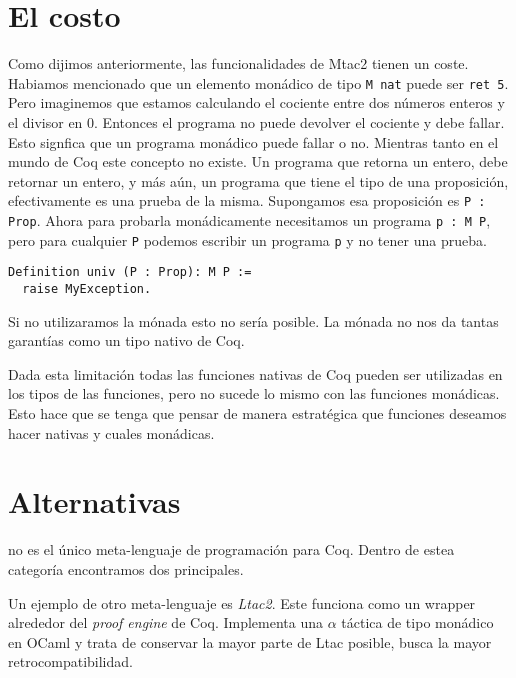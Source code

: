 \section{El costo}

Como dijimos anteriormente, las funcionalidades de Mtac2 tienen un coste. Habiamos mencionado que un elemento monádico de tipo \lstinline{M nat} puede ser \lstinline{ret 5}. Pero imaginemos que estamos calculando el cociente entre dos números enteros y el divisor en 0. Entonces el programa no puede devolver el cociente y debe fallar. Esto signfica que un programa monádico puede fallar o no. Mientras tanto en el mundo de Coq este concepto no existe. Un programa que retorna un entero, debe retornar un entero, y más aún, un programa que tiene el tipo de una proposición, efectivamente es una prueba de la misma. Supongamos esa proposición es \lstinline{P : Prop}. Ahora para probarla monádicamente necesitamos un programa \lstinline{p : M P}, pero para cualquier \lstinline{P} podemos escribir un programa \lstinline{p} y no tener una prueba.
\begin{lstlisting}
Definition univ (P : Prop): M P :=
  raise MyException.
\end{lstlisting}

Si no utilizaramos la mónada esto no sería posible. La mónada no nos da tantas garantías como un tipo nativo de Coq.

Dada esta limitación todas las funciones nativas de Coq pueden ser utilizadas en los tipos de las funciones, pero no sucede lo mismo con las funciones monádicas. Esto hace que se tenga que pensar de manera estratégica que funciones deseamos hacer nativas y cuales monádicas.

\section{Alternativas}

\Mtac no es el único meta-lenguaje de programación para Coq. 
Dentro de estea categoría encontramos dos principales.

Un ejemplo de otro meta-lenguaje es \emph{Ltac2}.
Este funciona como un wrapper alrededor del \emph{proof engine} de Coq.
Implementa una $\alpha$ táctica de tipo monádico en OCaml y trata de conservar la mayor parte de Ltac posible, busca la mayor retrocompatibilidad.

